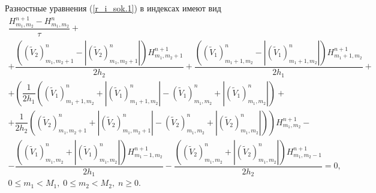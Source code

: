 \documentclass[a4paper,11pt]{article}
\begin{document}
Разностные уравнения (\ref{r_i_sok.1}) в индексах имеют вид
\begin{equation}
\begin{array}{c}
\dfrac{H^{n+1}_{m_1,m_2}-H^n_{m_1,m_2}}{\tau}+\\
+\dfrac{
(({{\tilde V}_2})^n_{m_1,m_2+1}-|({{\tilde V}_2})^n_{m_1,m_2+1}|)H_{m_1,m_2+1}^{n+1}
}{2h_2}
+\dfrac{
(({{\tilde V}_1})^n_{m_1+1,m_2}-|({{\tilde V}_1})^n_{m_1+1,m_2}|)H_{m_1+1,m_2}^{n+1}
}{2h_1}+ \\
+\left(\dfrac{1}{2h_1}
(({{\tilde V}_1})^n_{m_1+1,m_2}+|({{\tilde V}_1})^n_{m_1+1,m_2}|
-({{\tilde V}_1})^n_{m_1,m_2}+|({{\tilde V}_1})^n_{m_1,m_2}|)+\right.\\
\left.+\dfrac{1}{2h_2}
(({{\tilde V}_2})^n_{m_1,m_2+1}+|({{\tilde V}_2})^n_{m_1,m_2+1}|
-({{\tilde V}_2})^n_{m_1,m_2}+|({{\tilde V}_2})^n_{m_1,m_2}|)\right)
H_{m_1,m_2}^{n+1}
- \\
-\dfrac{
(({{\tilde V}_1})^n_{m_1,m_2}+|({{\tilde V}_1})^n_{m_1,m_2}|)H_{m_1-1,m_2}^{n+1}
}{2h_1}
-\dfrac{
(({{\tilde V}_2})^n_{m_1,m_2}+|({{\tilde V}_2})^n_{m_1,m_2}|)H_{m_1,m_2-1}^{n+1}
}{2h_2}=0, \\
0\le m_1 <M_1,\;0\le m_2 <M_2,\; n\ge 0.
\end{array}
\label{r_i_sok.2}
\end{equation}
\end{document}
